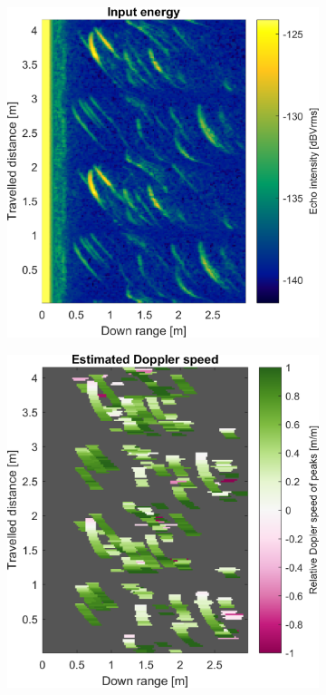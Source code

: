 \begin{figure}[htbp]
    \centering
    \begin{subfigure}[t]{0.475\linewidth}
        \centering
        \includegraphics[width=\linewidth,max height=.475\textheight]{gfx/results/dungeon_input.png}
    \end{subfigure}%
    \hfill%
    \begin{subfigure}[t]{0.475\linewidth}
        \centering
        \includegraphics[width=\linewidth,max height=.475\textheight]{gfx/results/dungeon_doppler.png}

\end{subfigure}
\end{figure}
